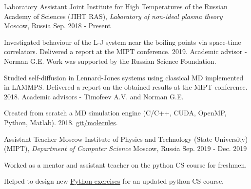 

\begin{cventries}

  \cventry
    {Laboratory Assistant} %
    {Joint Institute for High Temperatures of the Russian Academy of Sciences (JIHT RAS), \textit{Laboratory of non-ideal plasma theory}} %
    {Moscow, Russia} %
    {Sep. 2018 - Present} %
    {
      \begin{cvitems} %
        \item {Investigated behaviour of the L-J system near the boiling points via space-time correlators. Delivered a report at the MIPT conference. 2019. Academic advisor - Norman G.E. Work was supported by the Russian Science Foundation.}
      	\item {Studied self-diffusion in Lennard-Jones systems using classical MD implemented in LAMMPS. Delivered a report on the obtained results at the MIPT conference. 2018. Academic advisors - Timofeev A.V. and Norman G.E. }
      	\item {Created from scratch a MD simulation engine (C/C++, CUDA, OpenMP, Python, Matlab).  2018. \href{https://github.com/PolyachenkoYA/molecules}{git/molecules}.}
      \end{cvitems}
    }

  \cventry
    {Assistant Teacher} %
    {Moscow Institute of Physics and Technology (State University) (MIPT), \newline \textit{Department of Computer Science}} %
    {Moscow, Russia} %
    {Sep. 2019 - Dec. 2019} %
    {
      \begin{cvitems} %
        \item {Worked as a mentor and assistant teacher on the python CS course for freshmen.}
        \item {Helped to design new \href{http://cs.mipt.ru/python}{Python exercises} for an updated python CS course.}
      \end{cvitems}
    }
    

\end{cventries}
